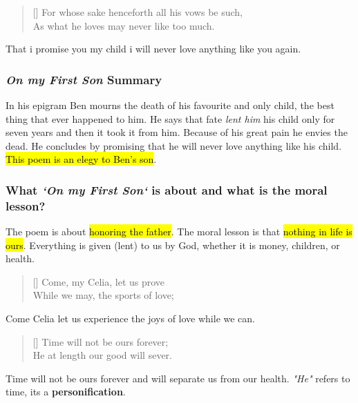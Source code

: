 \documentclass[12pt, a4paper]{article}
\newcommand{\attrib}[1]{\nopagebreak{\raggedleft\footnotesize #1\par}}
\begin{document}
\begin{verse}[\versewidth]
{\fontverse
For whose sake henceforth all his vows be such, \\
As what he loves may never like too much. 
}
\end{verse}

That i promise you my child i will never love anything like you 
again.\medbreak

\attrib{Poem is from \textit{Epigrams} (1616)}

\subsubsection*{\textit{On my First Son} Summary}

In his epigram Ben mourns the death of his favourite and only child, the best thing
that ever happened to him. He says that fate \textit{lent him} his child
only for seven years and then it took it from him. Because of his great
pain he envies the dead. He concludes by promising that he will never love
anything like his child. \hl{This poem is an elegy to Ben's
son}.

\subsubsection*{What \textit{`On my First Son`} is about and what
is the moral lesson?}

The poem is about \hl{honoring the father}. The moral lesson
is that \hl{nothing in life is ours}. Everything is given 
(lent) to us by God, whether it is money, children, or health.\bigbreak

\settowidth{\versewidth}{Come, my Celia, let us prove}
\begin{verse}[\versewidth]
{\fontverse
Come, my Celia, let us prove\\
While we may, the sports of love;
}
\end{verse}

Come Celia let us experience the joys of love while we can.

\begin{verse}[\versewidth]
{\fontverse
Time will not be ours forever;\\
He at length our good will sever.
}
\end{verse}

Time will not be ours forever and will separate us from 
our health. \textit{"He"} refers to time, its a \textbf{personification}.
\end{document}
